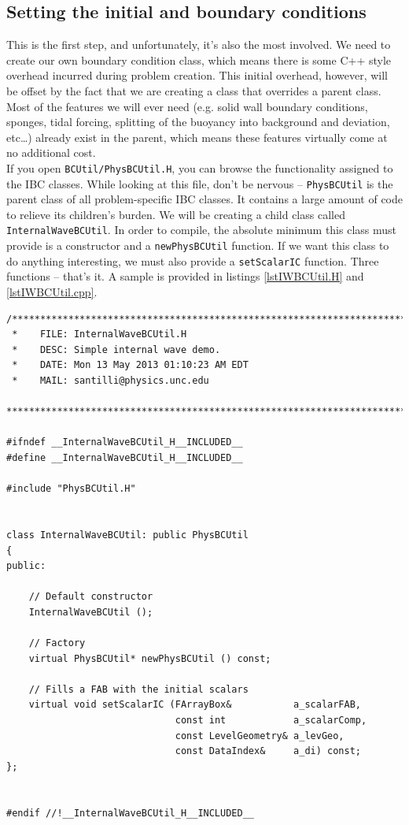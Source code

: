 \documentclass[12pt]{article}
\begin{document}
\subsection{Setting the initial and boundary conditions}\label{NewIBCSetup}
This is the first step, and unfortunately, it's also the most involved. We need to create our own boundary condition class, which means there is some C++ style overhead incurred during problem creation. This initial overhead, however, will be offset by the fact that we are creating a class that overrides a parent class. Most of the features we will ever need (e.g. solid wall boundary conditions, sponges, tidal forcing, splitting of the buoyancy into background and deviation, etc\dots) already exist in the parent, which means these features virtually come at no additional cost.\\

If you open \texttt{BCUtil/PhysBCUtil.H}, you can browse the functionality assigned to the IBC classes. While looking at this file, don't be nervous -- \texttt{PhysBCUtil} is the parent class of all problem-specific IBC classes. It contains a large amount of code to relieve its children's burden. We will be creating a child class called \texttt{InternalWaveBCUtil}. In order to compile, the absolute minimum this class must provide is a constructor and a \texttt{newPhysBCUtil} function. If we want this class to do anything interesting, we must also provide a \texttt{setScalarIC} function. Three functions -- that's it. A sample is provided in listings \ref{lstIWBCUtil.H} and \ref{lstIWBCUtil.cpp}.
\begin{lstlisting}[caption={The \texttt{InternalWaveBCUtil.H} file.}, label=lstIWBCUtil.H]
/*************************************************************************
 *    FILE: InternalWaveBCUtil.H
 *    DESC: Simple internal wave demo.
 *    DATE: Mon 13 May 2013 01:10:23 AM EDT
 *    MAIL: santilli@physics.unc.edu
 ************************************************************************/

#ifndef __InternalWaveBCUtil_H__INCLUDED__
#define __InternalWaveBCUtil_H__INCLUDED__

#include "PhysBCUtil.H"


class InternalWaveBCUtil: public PhysBCUtil
{
public:

    // Default constructor
    InternalWaveBCUtil ();

    // Factory
    virtual PhysBCUtil* newPhysBCUtil () const;

    // Fills a FAB with the initial scalars
    virtual void setScalarIC (FArrayBox&           a_scalarFAB,
                              const int            a_scalarComp,
                              const LevelGeometry& a_levGeo,
                              const DataIndex&     a_di) const;
};


#endif //!__InternalWaveBCUtil_H__INCLUDED__
\end{lstlisting}
\end{document}
